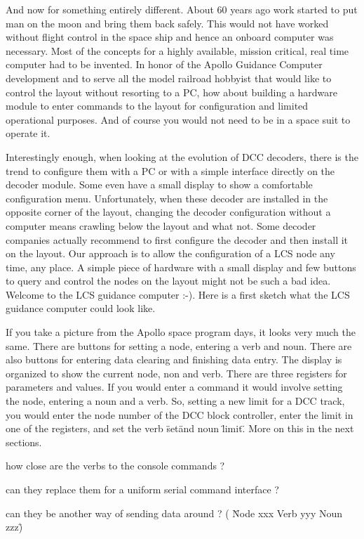 
And now for something entirely different. About 60 years ago work started to put man on the moon and bring them back safely. This would not have worked without flight control in the space ship and hence an onboard computer was necessary. Most of the concepts for a highly available, mission critical, real time computer had to be invented. In honor of the Apollo Guidance Computer development and to serve all the model railroad hobbyist that would like to control the layout without resorting to a PC, how about building a hardware module to enter commands to the layout for configuration and limited operational purposes. And of course you would not need to be in a space suit to operate it.

Interestingly enough, when looking at the evolution of DCC decoders, there is the trend to configure them with a PC or with a simple interface directly on the decoder module. Some even have a small display to show a comfortable configuration menu. Unfortunately, when these decoder are installed in the opposite corner of the layout, changing the decoder configuration without a computer means crawling below the layout and what not. Some decoder companies actually recommend to first configure the decoder and then install it on the layout. Our approach is to allow the configuration of a LCS node any time, any place. A simple piece of hardware with a small display and few buttons to query and control the nodes on the layout might not be such a bad idea. Welcome to the LCS guidance computer :-). Here is a first sketch what the LCS guidance computer could look like.


If you take a picture from the Apollo space program days, it looks very much the same. There are buttons for setting a node, entering a verb and noun. There are also buttons for entering data clearing and finishing data entry. The display is organized to show the current node, non and verb. There are three registers for parameters and values. If you would enter a command it would involve setting the node, entering a noun and a verb. So, setting a new limit for a DCC track, you would enter the node number of the DCC block controller, enter the limit in one of the registers, and set the verb \"set\" and noun \"limit\". More on this in the next sections.



how close are the verbs to the console commands ?

can they replace them for a uniform serial command interface ?

can they be another way of sending data around ? ( \"Node xxx Verb yyy Noun zzz\" )




